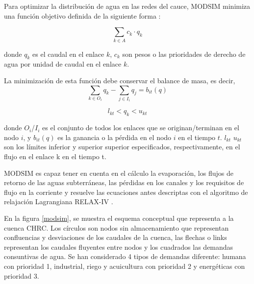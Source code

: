    Para optimizar la distribución de agua en las redes del cauce, MODSIM minimiza 
   una función objetivo definida de la siguiente forma \cite{modsim2}:

   \begin{equation}
    \sum_{k \in A}c_k\cdot q_k
   \end{equation}

   donde $q_k$ es el caudal en el enlace $k$, $c_k$ son pesos o las prioridades de derecho de agua por unidad de caudal en
   el enlace $k$. 

   La minimización de esta función debe conservar el balance de masa, es decir, 
   \begin{equation}
    \sum_{k \in O_i} q_k- \sum_{j \in I_i} q_j = b_{it}(q)
   \end{equation}

   \begin{equation}
    l_{kt} < q_k< u_{kt}
   \end{equation}

   donde $O_i$/$I_i$ es el conjunto de todos los enlaces que se originan/terminan en el nodo $i$,  
    y $b_{it}(q)$  es la ganancia o la pérdida en el nodo $i$ en el tiempo $t$. $l_{kt}$ $u_{kt}$ son los
    límites inferior y superior superior especificados, respectivamente, en el flujo en el enlace k en el tiempo t.

MODSIM es capaz tener en cuenta en el cálculo la evaporación, los flujos de retorno de las aguas subterráneas, 
las pérdidas en los canales y los requisitos de flujo en la corriente y resuelve las ecuaciones antes descriptas
con el algoritmo de relajación Lagrangiana RELAX-IV \cite{modim3}.


En la figura \ref{modsim}, se muestra el esquema conceptual que representa a la cuenca CHRC. Los círculos son
nodos sin almacenamiento que representan confluencias y desviaciones de los caudales de la cuenca,
las flechas o links representan los caudales fluyentes entre nodos y los cuadrados las demandas consuntivas de agua.
Se han considerado 4 tipos de demandas diferente: humana con prioridad 1, industrial, riego 
y acuicultura con prioridad 2 y energéticas con prioridad 3.



